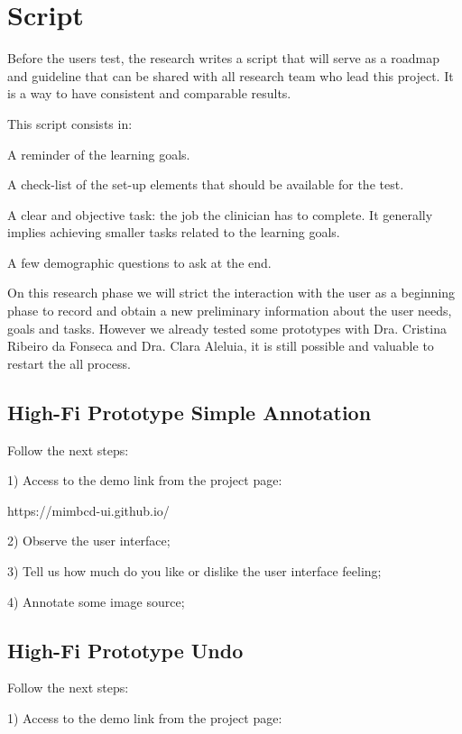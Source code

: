 \section{Script}

Before the users test, the research writes a script that will serve as a roadmap and guideline that can be shared with all research team who lead this project. It is a way to have consistent and comparable results.

This script consists in:

 A reminder of the learning goals.

 A check-list of the set-up elements that should be available for the test.

 A clear and objective task: the job the clinician has to complete. It generally implies achieving smaller tasks related to the learning goals.

 A few demographic questions to ask at the end.

On this research phase we will strict the interaction with the user as a beginning phase to record and obtain a new preliminary information about the user needs, goals and tasks. However we already tested some prototypes with Dra. Cristina Ribeiro da Fonseca and Dra. Clara Aleluia, it is still possible and valuable to restart the all process.

\clearpage

\subsection{High-Fi Prototype Simple Annotation}

Follow the next steps:

1) Access to the demo link from the project page:

https://mimbcd-ui.github.io/

2) Observe the user interface;

3) Tell us how much do you like or dislike the user interface feeling;

4) Annotate some image source;

\subsection{High-Fi Prototype Undo}

Follow the next steps:

1) Access to the demo link from the project page:

